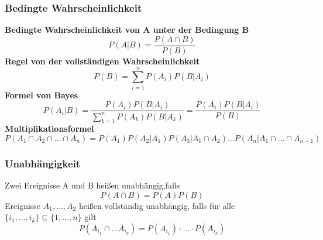 \documentclass[
	ngerman,
	accentcolor=9c,%
	type=intern,
	marginpar=false
	]{tudapub}
\begin{document}
            \subsubsection{Bedingte Wahrscheinlichkeit}
                \textbf{Bedingte Wahrscheinlichkeit von A unter der Bedingung B}
                \begin{equation*}
                    P(A|B) = \dfrac{P(A\cap B)}{P(B)}
                \end{equation*}
                \textbf{Regel von der vollständigen Wahrscheinlichkeit}
                \begin{equation*}
                    P(B) = \sum_{i=1}^n P(A_i)P(B|A_i)
                \end{equation*}
                \textbf{Formel von Bayes}
                \begin{equation*}
                    P(A_i|B) = \dfrac{P(A_i)P(B|A_i)}{\sum_{k=1}^n P(A_k)P(B|A_k)} = \dfrac{P(A_i)P(B|A_i)}{P(B)}
                \end{equation*}
                \textbf{Multiplikationsformel}
                \begin{equation*}
                    P(A_1 \cap A_2 \cap \dots \cap A_n) = P(A_1)P(A_2|A_1)P(A_3|A_1 \cap A_2) \dots P(A_n|A_1 \cap \dots \cap A_{n-1})
                \end{equation*}
            \subsubsection{Unabhängigkeit}
                \setcounter{satz}{2}
                \begin{definition}
                    Zwei Ereignisse A und B heißen unabhängig,falls
                    \begin{equation*}
                        P(A\cap B) = P(A)P(B)
                    \end{equation*}
                    Ereignisse $A_1, \dots, A_2$ heißen vollständig unabhängig, falls für alle $\{i_1, \dots, i_k\} \subseteq \{1, \dots, n\}$ gilt
                    \begin{equation*}
                        P(A_{i_1} \cap \dots A_{i_k}) = P(A_{i_1}) \cdot \dots \cdot P(A_{i_k})
                    \end{equation*}
                \end{definition}
\end{document}
